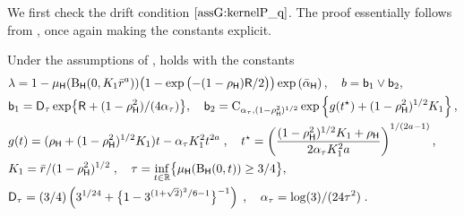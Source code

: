 We first check the drift condition $\Cref{assG:kernelP_q}$. The proof essentially follows from \cite[Lemma~3.2]{hairer:stuart:vollmer:2012}, once again making  the constants explicit.
\begin{lemma}
Under the assumptions of ,  holds with the constants
\begin{equation}
\label{eq:drift_constants_pcn}
\begin{split}
& \lambda = 1 - \mu_{\mathsf{H}}(\operatorname{B}_{\mathsf{H}}(0,K_1 \bar{r}^{a}))\bigl(1-
\exp{\bigl(-(1-\rho_{\mathsf{H}})\mathsf{R}/2\bigr)}\bigr)\exp\left(\bar{\alpha}_{\mathsf{H}}\right), \quad b = \mathsf{b}_1 \vee \mathsf{b}_2, \\
& \mathsf{b}_1 = \mathsf{D}_{\tau}\exp\bigl\{\mathsf{R} + (1-\rho_{\mathsf{H}}^2)/(4\alpha_{\tau})\bigr\}, \quad \mathsf{b}_2 = \operatorname{C}_{\alpha_{\tau},(1-\rho_{\mathsf{H}}^2)^{1/2}}\exp\left\{g(t^{\star}) + (1-\rho_{\mathsf{H}}^2)^{1/2}K_1\right\}, \\
& g(t) = (\rho_{\mathsf{H}} + (1-\rho_{\mathsf{H}}^2)^{1/2} K_1)t - \alpha_{\tau} K_1^2 t^{2a}\;, \quad
t^{\star} = \left(\frac{(1-\rho_{\mathsf{H}}^2)^{1/2} K_1 + \rho_{\mathsf{H}}}{2\alpha_{\tau} K_1^2 a}\right)^{1/(2a-1)}, \\
& K_1 = \bar{r}/(1-\rho_{\mathsf{H}}^2)^{1/2}\;, \quad \tau = \inf_{t \in \mathbb{R}}\bigl\{\mu_{\mathsf{H}}(\operatorname{B}_{\mathsf{H}}(0,t)) \geq 3/4\bigr\}, \\
& \mathsf{D}_{\tau} = (3/4)\left(3^{1/24} + \bigl\{1 - 3^{(1+\sqrt{2})^2/6 - 1}\bigr\}^{-1}\right)\;, \quad \alpha_{\tau} = \log(3)/(24\tau^2)\;.
\end{split}
\end{equation}
\end{lemma}
